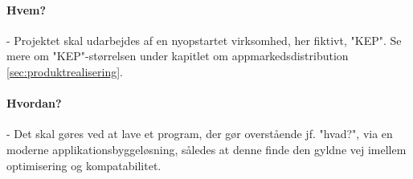 \paragraph{Hvem?} - Projektet skal udarbejdes af en nyopstartet virksomhed, her fiktivt, "KEP". Se mere om "KEP"-størrelsen under kapitlet om appmarkedsdistribution \ref{sec:produktrealisering}.
\paragraph{Hvordan?} - Det skal gøres ved at lave et program, der gør overstående jf. "hvad?", via en moderne applikationsbyggeløsning, således at denne finde den gyldne vej imellem optimisering og kompatabilitet.